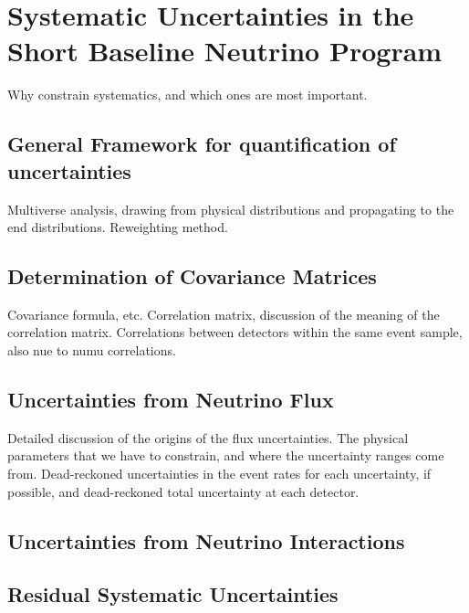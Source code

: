 \chapter{Systematic Uncertainties in the Short Baseline Neutrino Program}

Why constrain systematics, and which ones are most important.  

\section{General Framework for quantification of uncertainties}

Multiverse analysis, drawing from physical distributions and propagating to the end distributions.  Reweighting method.

\section{Determination of Covariance Matrices}

Covariance formula, etc. Correlation matrix, discussion of the meaning of the correlation matrix.  Correlations between detectors within the same event sample, also nue to numu correlations.

\section{Uncertainties from Neutrino Flux}

\label{section:flux_uncert}

Detailed discussion of the origins of the flux uncertainties.  The physical parameters that we have to constrain, and where the uncertainty ranges come from.  Dead-reckoned uncertainties in the event rates for each uncertainty, if possible, and dead-reckoned total uncertainty at each detector.

\section{Uncertainties from Neutrino Interactions}

\section{Residual Systematic Uncertainties}